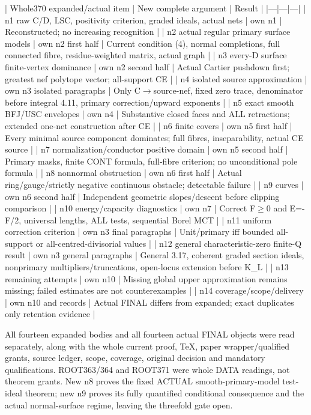 \documentclass[11pt]{article}
\begin{document}
| Whole370 expanded/actual item | New complete argument | Result | |---|---|---| | n1 raw C/D, LSC, positivity criterion, graded ideals, actual nets | own n1 | Reconstructed; no increasing recognition | | n2 actual regular primary surface models | own n2 first half | Current condition (4), normal completions, full connected fibre, residue-weighted matrix, actual graph | | n3 every-D surface finite-vertex dominance | own n2 second half | Actual Cartier pushdown first; greatest nef polytope vector; all-support CE | | n4 isolated source approximation | own n3 isolated paragraphs | Only C\ensuremath{\to}source-nef, fixed zero trace, denominator before integral 4.11, primary correction/upward exponents | | n5 exact smooth BFJ/USC envelopes | own n4 | Substantive closed faces and ALL retractions; extended one-net construction after CE | | n6 finite covers | own n5 first half | Every minimal source component dominates; full fibres, inseparability, actual CE source | | n7 normalization/conductor positive domain | own n5 second half | Primary masks, finite CONT formula, full-fibre criterion; no unconditional pole formula | | n8 nonnormal obstruction | own n6 first half | Actual ring/gauge/strictly negative continuous obstacle; detectable failure | | n9 curves | own n6 second half | Independent geometric slopes/descent before clipping comparison | | n10 energy/capacity diagnostics | own n7 | Correct F\ensuremath{\geq}0 and E=-F/2, universal lengths, ALL tests, sequential Borel MCT | | n11 uniform correction criterion | own n3 final paragraphs | Unit/primary iff bounded all-support or all-centred-divisorial values | | n12 general characteristic-zero finite-Q result | own n3 general paragraphs | General 3.17, coherent graded section ideals, nonprimary multipliers/truncations, open-locus extension before K\_L | | n13 remaining attempts | own n10 | Missing global upper approximation remains missing; failed estimates are not counterexamples | | n14 coverage/scope/delivery | own n10 and records | Actual FINAL differs from expanded; exact duplicates only retention evidence |

All fourteen expanded bodies and all fourteen actual FINAL objects were read separately, along with the whole current proof, TeX, paper wrapper/qualified grants, source ledger, scope, coverage, original decision and mandatory qualifications. ROOT363/364 and ROOT371 were whole DATA readings, not theorem grants. New n8 proves the fixed ACTUAL smooth-primary-model test-ideal theorem; new n9 proves its fully quantified conditional consequence and the actual normal-surface regime, leaving the threefold gate open.
\end{document}
